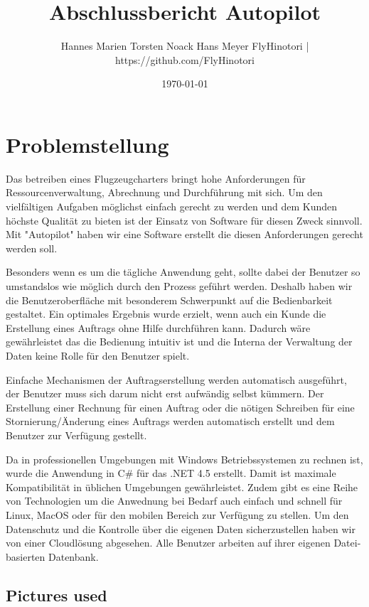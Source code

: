 \documentclass[12pt]{article}
\title{Abschlussbericht Autopilot}
\author{Hannes Marien \newline Torsten Noack \newline Hans Meyer \newline FlyHinotori | https://github.com/FlyHinotori}
\date{\today}
\begin{document}
\maketitle

\tableofcontents
\clearpage

\section{Problemstellung}

Das betreiben eines Flugzeugcharters bringt hohe Anforderungen für Ressourcenverwaltung, Abrechnung und Durchführung mit sich. Um den vielfältigen Aufgaben möglichst einfach gerecht zu werden und dem Kunden höchste Qualität zu bieten ist der Einsatz von Software für diesen Zweck sinnvoll. Mit "Autopilot" haben wir eine Software erstellt die diesen Anforderungen gerecht werden soll.

Besonders wenn es um die tägliche Anwendung geht, sollte dabei der Benutzer so umstandslos wie möglich durch den Prozess geführt werden. Deshalb haben wir die Benutzeroberfläche mit besonderem Schwerpunkt auf die Bedienbarkeit gestaltet. Ein optimales Ergebnis wurde erzielt, wenn auch ein Kunde die Erstellung eines Auftrags ohne Hilfe durchführen kann. Dadurch wäre gewährleistet das die Bedienung intuitiv ist und die Interna der Verwaltung der Daten keine Rolle für den Benutzer spielt.

Einfache Mechanismen der Auftragserstellung werden automatisch ausgeführt, der Benutzer muss sich darum nicht erst aufwändig selbst kümmern. Der Erstellung einer Rechnung für einen Auftrag oder die nötigen Schreiben für eine Stornierung/Änderung eines Auftrags werden automatisch erstellt und dem Benutzer zur Verfügung gestellt.

Da in professionellen Umgebungen mit Windows Betriebssystemen zu rechnen ist, wurde die Anwendung in C# für das .NET 4.5 erstellt. Damit ist maximale Kompatibilität in üblichen Umgebungen gewährleistet. Zudem gibt es eine Reihe von Technologien um die Anwednung bei Bedarf auch einfach und schnell für Linux, MacOS oder für den mobilen Bereich zur Verfügung zu stellen. Um den Datenschutz und die Kontrolle über die eigenen Daten sicherzustellen haben wir von einer Cloudlösung abgesehen. Alle Benutzer arbeiten auf ihrer eigenen Datei-basierten Datenbank.

\subsection{Pictures used}
\end{document}
